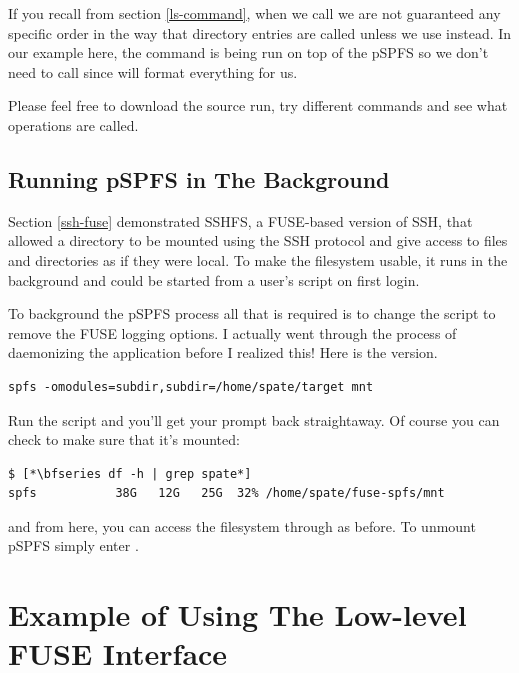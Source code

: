 \noindent 
If you recall from section \ref{ls-command}, when we call  we are not guaranteed any specific order in the way that directory entries are called unless we use  instead. In our example here, the  command is being run on top of the pSPFS so we don't need to call  since  will format everything for us.

Please feel free to download the source run, try different commands and see what operations are called.


\subsection{Running pSPFS in The Background}

Section \ref{ssh-fuse} demonstrated SSHFS, a FUSE-based version of SSH, that allowed a directory to be mounted using the SSH protocol and give access to files and directories as if they were local. To make the filesystem usable, it runs in the background and could be started from a user's  script on first login.

To background the pSPFS process all that is required is to change the  script to remove the FUSE logging options. I actually went through the process of daemonizing the application before I realized this! Here is the  version.

\begin{lstlisting}
spfs -omodules=subdir,subdir=/home/spate/target mnt
\end{lstlisting}

\noindent
Run the script and you'll get your prompt back straightaway. Of course you can check to make sure that it's mounted:

\begin{lstlisting}
$ [*\bfseries df -h | grep spate*]
spfs           38G   12G   25G  32% /home/spate/fuse-spfs/mnt
\end{lstlisting}

\noindent
and from here, you can access the filesystem through  as before. To unmount pSPFS simply enter .


\section{Example of Using The Low-level FUSE Interface}

